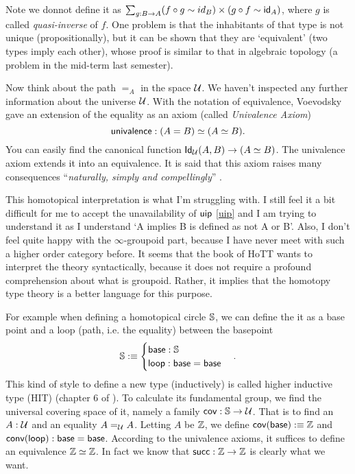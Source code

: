Note we donnot define it as $\sum_{g:B\to A}(f\circ g\sim id_B)\times
(g\circ f\sim \text{\sf id}_A)$, where $g$ is called {\it quasi-inverse} of $f$.
One problem is that the inhabitants of that type is not unique 
(propositionally), but it can be shown that they are `equivalent' (two 
types imply each other), whose proof is similar to that in algebraic 
topology (a problem in the mid-term last semester). 

Now think about the path $=_A$ in the space $\mathcal{U}$. We haven't 
inspected any further information about the universe $\mathcal{U}$.
With the notation of equivalence, Voevodsky gave an extension of the
equality as an axiom (called {\it Univalence Axiom})
\newcommand{\univalence}{\name{univalence}}
$$
    \univalence: (A=B)\simeq(A\simeq B).
$$
You can easily find the canonical function $\text{\sf Id}_{\mathcal{U}}(A,B)\to(A\simeq B)$. 
The univalence axiom extends it into an equivalence. It is said that this
axiom raises many consequences ``{\it naturally, simply and compellingly}''
\cite{homotopy-type-theory}. 

This homotopical interpretation is what I'm struggling with. I still
feel it a bit difficult for me to accept the unavailability of $\text{\sf uip}$
\eqref{uip} and I am trying to understand it as I understand `A implies B
is defined as not A or B'. Also, I don't feel quite happy with the
$\infty$-groupoid part, because I have never meet with such a higher
order category before. It seems that the book of HoTT\cite{homotopy-type-theory} 
wants to interpret the theory syntactically, because it does not require a 
profound comprehension about what is groupoid. Rather, it implies that the
homotopy type theory is a better language for this purpose. 

For example when defining a homotopical circle $\mathbb{S}$, we can define 
the it as a base point and a loop (path, i.e. the equality) between the 
basepoint
\newcommand{\base}{\name{base}}
\newcommand{\nloop}{\name{loop}}
$$
    \sphere\defn\begin{cases}
        \base: \sphere \\
        \nloop: \base=\base \\
    \end{cases}.
$$
This kind of style to define a new type (inductively) is called higher
inductive type (HIT) (chapter 6 of \cite{homotopy-type-theory}).
To calculate its fundamental group, we find the universal covering space 
of it, namely a family $\text{\sf cov}:\mathbb{S}\to\mathcal{U}$. That is to
find an $A: \mathcal{U}$ and an equality $A=_{\mathcal{U}} A$. Letting $A$
be $\mathbb{Z}$, we define $\name{cov}(\base)\defn\integer$ and 
$\name{conv}(\nloop):\base=\base$. According to the univalence axioms,
it suffices to define an equivalence $\mathbb{Z}\simeq\mathbb{Z}$. In fact
we know that $\text{\sf succ}: \mathbb{Z}\to\mathbb{Z}$ is clearly what we want.

